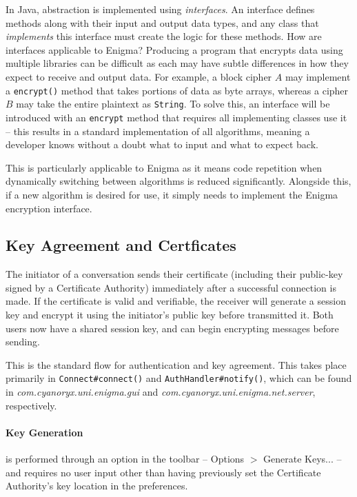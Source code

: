   In Java, abstraction is implemented using \emph{interfaces}. An interface defines methods along with their input and output data types, and any class that \emph{implements} this interface must create the logic for these methods. How are interfaces applicable to Enigma? Producing a program that encrypts data using multiple libraries can be difficult as each may have subtle differences in how they expect to receive and output data. For example, a block cipher $A$ may implement a \verb!encrypt()! method that takes portions of data as byte arrays, whereas a cipher $B$ may take the entire plaintext as \verb!String!. To solve this, an interface will be introduced with an \verb!encrypt! method that requires all implementing classes use it -- this results in a standard implementation of all algorithms, meaning a developer knows without a doubt what to input and what to expect back.
  
  This is particularly applicable to Enigma as it means code repetition when dynamically switching between algorithms is reduced significantly. Alongside this, if a new algorithm is desired for use, it simply needs to implement the Enigma encryption interface.
  
  \subsection{Key Agreement and Certficates}
  
  The initiator of a conversation sends their certificate (including their public-key signed by a Certificate Authority) immediately after a successful connection is made. If the certificate is valid and verifiable, the receiver will generate a session key and encrypt it using the initiator's public key before transmitted it. Both users now have a shared session key, and can begin encrypting messages before sending.
  
  This is the standard flow for authentication and key agreement. This takes place primarily in \verb!Connect#connect()! and \verb!AuthHandler#notify()!, which can be found in \emph{com.cyanoryx.uni.enigma.gui} and \emph{com.cyanoryx.uni.enigma.net.server}, respectively.
  
  \paragraph{Key Generation} is performed through an option in the toolbar -- Options $>$ Generate Keys... -- and requires no user input other than having previously set the Certificate Authority's key location in the preferences.
    
